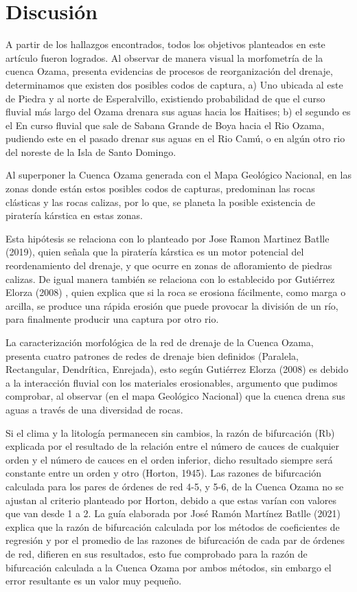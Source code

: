 \documentclass[11pt,]{article}
\begin{document}
\newpage

\section{Discusión}\label{discusiuxf3n}

A partir de los hallazgos encontrados, todos los objetivos planteados en
este artículo fueron logrados. Al observar de manera visual la
morfometría de la cuenca Ozama, presenta evidencias de procesos de
reorganización del drenaje, determinamos que existen dos posibles codos
de captura, a) Uno ubicada al este de Piedra y al norte de Esperalvillo,
existiendo probabilidad de que el curso fluvial más largo del Ozama
drenara sus aguas hacia los Haitises; b) el segundo es el En curso
fluvial que sale de Sabana Grande de Boya hacia el Rio Ozama, pudiendo
este en el pasado drenar sus aguas en el Rio Camú, o en algún otro rio
del noreste de la Isla de Santo Domingo.

Al superponer la Cuenca Ozama generada con el Mapa Geológico Nacional,
en las zonas donde están estos posibles codos de capturas, predominan
las rocas clásticas y las rocas calizas, por lo que, se planeta la
posible existencia de piratería kárstica en estas zonas.

Esta hipótesis se relaciona con lo planteado por Jose Ramon Martinez
Batlle (2019), quien señala que la piratería kárstica es un motor
potencial del reordenamiento del drenaje, y que ocurre en zonas de
afloramiento de piedras calizas. De igual manera también se relaciona
con lo establecido por Gutiérrez Elorza (2008) , quien explica que si la
roca se erosiona fácilmente, como marga o arcilla, se produce una rápida
erosión que puede provocar la división de un río, para finalmente
producir una captura por otro rio.

La caracterización morfológica de la red de drenaje de la Cuenca Ozama,
presenta cuatro patrones de redes de drenaje bien definidos (Paralela,
Rectangular, Dendrítica, Enrejada), esto según Gutiérrez Elorza (2008)
es debido a la interacción fluvial con los materiales erosionables,
argumento que pudimos comprobar, al observar (en el mapa Geológico
Nacional) que la cuenca drena sus aguas a través de una diversidad de
rocas.

Si el clima y la litología permanecen sin cambios, la razón de
bifurcación (Rb) explicada por el resultado de la relación entre el
número de cauces de cualquier orden y el número de cauces en el orden
inferior, dicho resultado siempre será constante entre un orden y otro
(Horton, 1945). Las razones de bifurcación calculada para los pares de
órdenes de red 4-5, y 5-6, de la Cuenca Ozama no se ajustan al criterio
planteado por Horton, debido a que estas varían con valores que van
desde 1 a 2. La guía elaborada por José Ramón Martínez Batlle (2021)
explica que la razón de bifurcación calculada por los métodos de
coeficientes de regresión y por el promedio de las razones de
bifurcación de cada par de órdenes de red, difieren en sus resultados,
esto fue comprobado para la razón de bifurcación calculada a la Cuenca
Ozama por ambos métodos, sin embargo el error resultante es un valor muy
pequeño.
\end{document}
